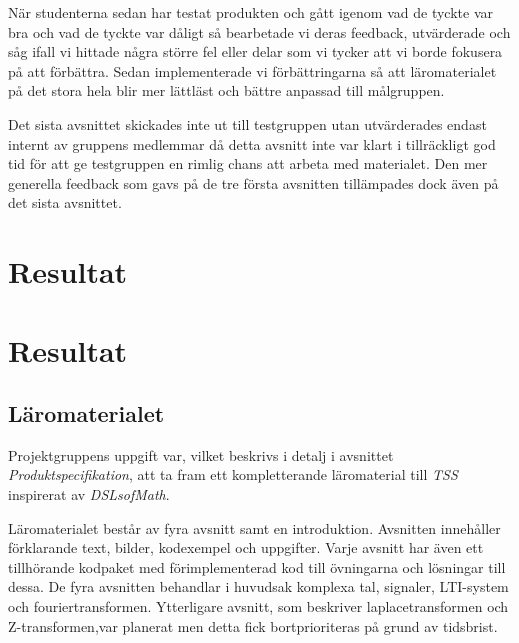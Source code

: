 \documentclass[]{article}
\begin{document}
När studenterna sedan har testat produkten och gått igenom vad de tyckte var bra och vad de tyckte var dåligt så
bearbetade vi deras feedback, utvärderade och såg ifall vi hittade några större fel eller delar som vi tycker att vi
borde fokusera på att förbättra. Sedan implementerade vi förbättringarna så att läromaterialet på det stora hela blir
mer lättläst och bättre anpassad till målgruppen.

Det sista avsnittet skickades inte ut till testgruppen utan utvärderades endast internt av gruppens medlemmar då detta
avsnitt inte var klart i tillräckligt god tid för att ge testgruppen en rimlig chans att arbeta med materialet. Den mer
generella feedback som gavs på de tre första avsnitten tillämpades dock även på det sista avsnittet.


\section{Resultat}


%

\section{Resultat}


%

\subsection{Läromaterialet}
Projektgruppens uppgift var, vilket beskrivs i detalj i avsnittet \textit{Produktspecifikation}, att ta fram ett kompletterande 
läromaterial till \textit{TSS} inspirerat av \textit{DSLsofMath}.

Läromaterialet består av fyra avsnitt samt en introduktion. Avsnitten innehåller förklarande text, bilder, kodexempel 
och uppgifter. Varje avsnitt har även ett tillhörande kodpaket med förimplementerad kod till övningarna och lösningar 
till dessa. De fyra avsnitten behandlar i huvudsak komplexa tal, signaler, LTI-system och fouriertransformen. 
Ytterligare avsnitt, som beskriver laplacetransformen och Z-transformen,var planerat men detta fick bortprioriteras på 
grund av tidsbrist. 
\end{document}
